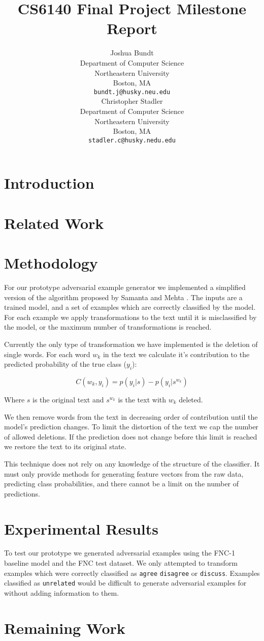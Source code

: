 \documentclass{article}
\title{CS6140 Final Project Milestone Report}
\author{
  Joshua Bundt \\
  Department of Computer Science\\
  Northeastern University\\
  Boston, MA \\
  \texttt{bundt.j@husky.neu.edu} \\
  \And
  Christopher Stadler \\
  Department of Computer Science \\
  Northeastern University \\
  Boston, MA \\
  \texttt{stadler.c@husky.nedu.edu} \\
}
\begin{document}

\maketitle

\section{Introduction}

\section{Related Work}

\section{Methodology}
For our prototype adversarial example generator we implemented a simplified version of the algorithm proposed by Samanta and Mehta \cite{samanta_towards_2017}. The inputs are a trained model, and a set of examples which are correctly classified by the model. For each example we apply transformations to the text until it is misclassified by the model, or the maximum number of transformations is reached.

Currently the only type of transformation we have implemented is the deletion of single words. For each word $w_k$ in the text we calculate it's contribution to the predicted probability of the true class ($y_i$):

\begin{equation}
    C(w_k, y_i) = p(y_i | s) - p(y_i | s^{w_k})
\end{equation}

Where $s$ is the original text and $s^{w_k}$ is the text with $w_k$ deleted.

We then remove words from the text in decreasing order of contribution until the model's prediction changes. To limit the distortion of the text we cap the number of allowed deletions. If the prediction does not change before this limit is reached we restore the text to its original state.

This technique does not rely on any knowledge of the structure of the classifier. It must only provide methods for generating feature vectors from the raw data, predicting class probabilities, and there cannot be a limit on the number of predictions.

\section{Experimental Results}
To test our prototype we generated adversarial examples using the FNC-1 baseline model \cite{noauthor_baseline_2018} and the FNC test dataset. We only attempted to transform examples which were correctly classified as \texttt{agree} \texttt{disagree} or \texttt{discuss}. Examples classified as \texttt{unrelated} would be difficult to generate adversarial examples for without adding information to them.

\section{Remaining Work}

\medskip



\end{document}
